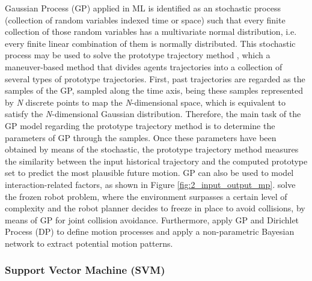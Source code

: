 Gaussian Process (GP) applied in ML \cite{rasmussen2004gaussian} is identified as an stochastic process (collection of random variables indexed time or space) such that every finite collection of those random variables has a multivariate normal distribution, i.e. every finite linear combination of them is normally distributed. This stochastic process may be used to solve the prototype trajectory method \cite{joseph2011bayesian, tran2014online}, which a maneuver-based method that divides agents trajectories into a collection of several types of prototype trajectories. First, past trajectories are regarded as the samples of the GP, sampled along the time axis, being these samples represented by \textit{N} discrete points to map the \textit{N}-dimensional space, which is equivalent to satisfy the \textit{N}-dimensional Gaussian distribution. Therefore, the main task of the GP model regarding the prototype trajectory method is to determine the parameters of GP through the samples. Once these parameters have been obtained by means of the stochastic, the prototype trajectory method measures the similarity between the input historical trajectory and the computed prototype set to predict the most plausible future motion. GP can also be used to model interaction-related factors, as shown in Figure \ref{fig:2_input_output_mp}. \cite{trautman2010unfreezing} solve the frozen robot problem, where the environment surpasses a certain level of complexity and the robot planner decides to freeze in place to avoid collisions, by means of GP for joint collision avoidance. Furthermore, \cite{guo2019modeling} apply GP and Dirichlet Process (DP) to define motion processes and apply a non-parametric Bayesian network to extract potential motion patterns.

\subsubsection{Support Vector Machine (SVM)}
\label{subsubsec:2_svm_mp}

